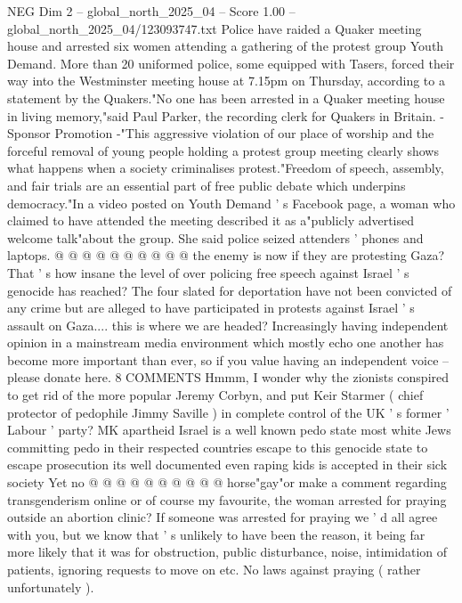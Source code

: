 \begin{textsample}{NEG Dim 2 – global\_north\_2025\_04 – Score 1.00 – global\_north\_2025\_04/123093747.txt}  \label{ex:f2_neg_125}
Police have raided a Quaker meeting house and arrested six women attending a gathering of the protest group Youth Demand.
More than 20 uniformed police, some equipped with Tasers, forced their way into the Westminster meeting house at 7.15pm on Thursday, according to a statement by the Quakers."No one has been arrested in a Quaker meeting house in living memory,"said Paul Parker, the recording clerk for Quakers in Britain. - Sponsor Promotion -"This aggressive violation of our place of worship and the forceful removal of young people holding a protest group meeting clearly shows what happens when a society criminalises protest."Freedom of speech, assembly, and fair trials are an essential part of free public debate which underpins democracy."In a video posted on Youth Demand ' s Facebook page, a woman who claimed to have attended the meeting described it as a"publicly advertised welcome talk"about the group.
She said police seized attenders ' phones and laptops. @ @ @ @ @ @ @ @ @ @ the enemy is now if they are protesting Gaza?
That ' s how insane the level of over policing free speech against Israel ' s genocide has reached?
The four slated for deportation have not been convicted of any crime but are alleged to have participated in protests against Israel ' s assault on Gaza.... this is where we are headed?
Increasingly having independent opinion in a mainstream media environment which mostly echo one another has become more important than ever, so if you value having an independent voice -- please donate here. 8 COMMENTS Hmmm, I wonder why the zionists conspired to get rid of the more popular Jeremy Corbyn, and put Keir Starmer ( chief protector of pedophile Jimmy Saville ) in complete control of the UK ' s former ' Labour ' party?
MK apartheid Israel is a well known pedo state most white Jews committing pedo in their respected countries escape to this genocide state to escape prosecution its well documented even raping kids is accepted in their sick society Yet no @ @ @ @ @ @ @ @ @ @ horse"gay"or make a comment regarding transgenderism online or of course my favourite, the woman arrested for praying outside an abortion clinic?
If someone was arrested for praying we ' d all agree with you, but we know that ' s unlikely to have been the reason, it being far more likely that it was for obstruction, public disturbance, noise, intimidation of patients, ignoring requests to move on etc.
No laws against praying ( rather unfortunately ).

\end{textsample}
